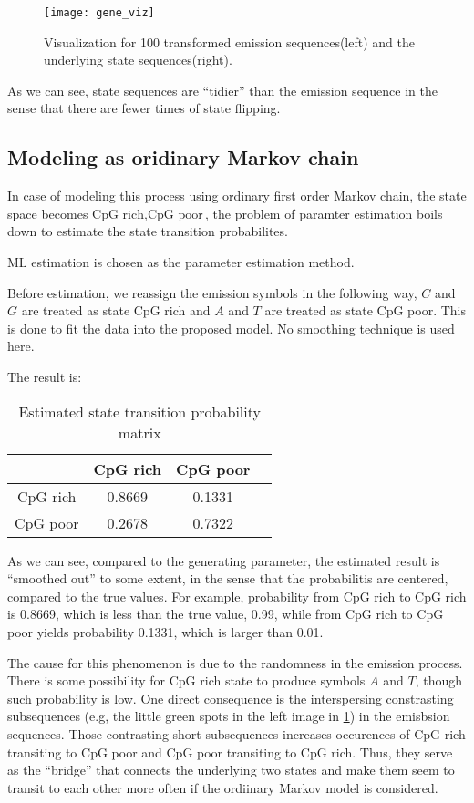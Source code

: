 \documentclass[paper=a4, fontsize=11pt]{scrartcl} %
\numberwithin{equation}{section} %
\numberwithin{figure}{section} %
\numberwithin{table}{section} %
\begin{document}
\begin{figure}[H]
  \centering
  \texttt{[image: gene\_viz]}
  \caption {Visualization for 100 transformed emission sequences(left) and the underlying state sequences(right).}
  \label {fig:5.gene_viz}
\end{figure}

As we can see, state sequences are ``tidier'' than the emission sequence in the sense that there are fewer times of state flipping.

\subsection {Modeling as oridinary Markov chain}

In case of modeling this process using ordinary first order Markov chain, the state space becomes ${\text{CpG rich}, \text{CpG poor}}$, the problem of paramter estimation boils down to estimate the state transition probabilites.

ML estimation is chosen as the  parameter estimation method. 

Before estimation, we reassign the emission symbols in the following way, $C$ and $G$ are treated as state CpG rich and $A$ and $T$ are treated as state CpG poor.  This is done to fit the data into the proposed model. No smoothing technique is used here.

The result is:

\begin{table}[H]
\caption{Estimated state transition probability matrix}
\centering
\begin{tabular}{c|ccc}
  & CpG rich & CpG poor  \\ \hline
  CpG rich & 0.8669 &   0.1331 \\
  CpG poor & 0.2678 &   0.7322
\end {tabular}
\end {table}

As we can see, compared to the generating parameter, the estimated result is ``smoothed out'' to some extent, in the sense that the probabilitis are centered, compared to the true values. For example, probability from CpG rich to CpG rich is 0.8669, which is less than the true value, 0.99, while from CpG rich to CpG poor yields probability 0.1331, which is larger than 0.01.

The cause for this phenomenon is due to the randomness in the emission process. There is some possibility for CpG rich state to produce symbols $A$ and $T$, though such probability is low. One direct consequence is the interspersing constrasting subsequences (e.g, the little green spots in the left image in \ref{fig:5.gene_viz}) in the emisbsion sequences. Those contrasting short subsequences increases occurences of CpG rich transiting to CpG poor and CpG poor transiting to CpG rich. Thus, they serve as the ``bridge'' that connects the underlying two states and make them seem to transit to each other more often if the ordiinary Markov model is considered.
\end{document}
